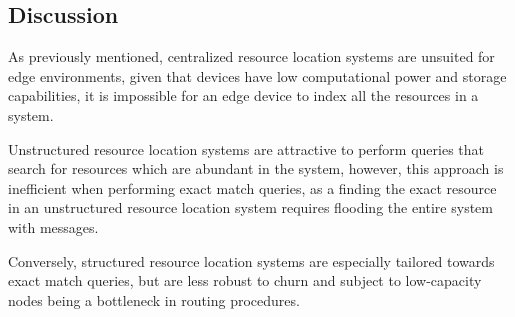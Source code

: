 \subsection{Discussion}

As previously mentioned, centralized resource location systems are unsuited for edge environments, given that devices have low computational power and storage capabilities, it is impossible for an edge device to index all the resources in a system.

Unstructured resource location systems are attractive to perform queries that search for resources which are abundant in the system, however, this approach is inefficient when performing exact match queries, as a finding the exact resource in an unstructured resource location system requires flooding the entire system with messages.

Conversely, structured resource location systems are especially tailored towards exact match queries, but are less robust to churn and subject to low-capacity nodes being a bottleneck in routing procedures. 









